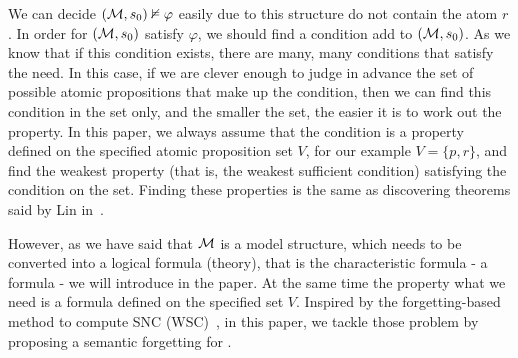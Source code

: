 \documentclass{article}
\begin{document}
We can decide $({\cal M}, s_0)\nvDash \varphi$ easily due to this structure do not contain the atom $r$.
In order for $({\cal M}, s_0)$ satisfy $\varphi$, we should find a condition add to $({\cal M}, s_0)$.
 As we know that if this condition exists, there are many, many conditions that satisfy the need.
In this case, if we are clever enough to judge in advance the set of possible atomic propositions that make up the condition, then we can find this condition in the set only, and the smaller the set, the easier it is to work out the property.
In this paper, we always assume that the condition is a property defined on the specified atomic proposition set $V$, for our example $V=\{p,r\}$, and find the weakest property (that is, the weakest sufficient condition) satisfying the condition on the set. Finding these properties is the same as discovering theorems said by Lin in~\cite{DBLP:journals/aim/Lin18}.

However, as we have said that ${\cal M}$ is a model structure, which needs to be converted into a logical formula (theory), that is the characteristic formula - a \CTL formula - we will introduce in the paper.
At the same time the property what we need is a formula defined on the specified set $V$.
Inspired by the forgetting-based method to compute SNC (WSC)~\cite{DBLP:journals/ai/Lin01}, in this paper, we tackle those problem by proposing a semantic forgetting for \CTL.


\end{document}
